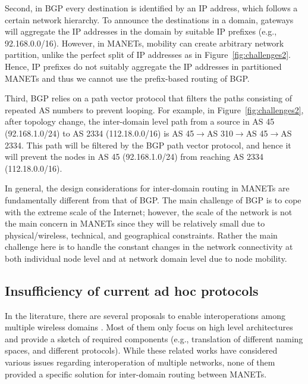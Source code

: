 Second, in BGP every destination is identified by an IP address, which follows a certain network hierarchy. To announce the destinations in a domain, gateways will aggregate the IP addresses in the domain by suitable IP prefixes (e.g., 92.168.0.0/16).  However, in MANETs, mobility %
can create arbitrary network partition, unlike the perfect split of IP addresses as in Figure~\ref{fig:challenges2}.  Hence, IP prefixes do not suitably aggregate the IP addresses in partitioned MANETs and thus we cannot use the prefix-based routing of BGP.

Third, BGP relies on a path vector protocol that filters the paths consisting of repeated AS numbers to prevent looping. For example, in Figure~\ref{fig:challenges2}, after topology change, the inter-domain level path from a source in AS 45 (92.168.1.0/24) to AS 2334 (112.18.0.0/16) is AS 45$\to$AS 310$\to$AS 45$\to$AS 2334. This path will be filtered by the BGP path vector protocol, and hence it will prevent the nodes in AS 45 (92.168.1.0/24) from reaching AS 2334 (112.18.0.0/16). 

In general, the design considerations for inter-domain routing in MANETs are fundamentally different from that of BGP. The main challenge of BGP is to cope with the extreme scale of the Internet; however, the scale of the network is not the main concern in MANETs since they will be relatively small due to physical/wireless, technical, and geographical constraints. Rather the main challenge here is to handle the constant changes in the network connectivity at both individual node level and at network domain level due to node mobility. 

\subsection{Insufficiency of current ad hoc protocols}

In the literature, there are several proposals to enable interoperations among multiple wireless domains \cite{crowcroft03plutarch}\cite{SEBQ04turfnet}. Most of them only focus on high level architectures and provide a sketch of required components (e.g., translation of different naming spaces, and different protocols). 
While these related works have considered various issues regarding interoperation of multiple networks, none of them provided a specific solution for inter-domain routing between MANETs. 


